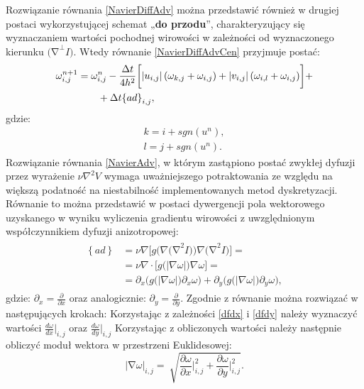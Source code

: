 \documentclass[a4paper,12pt,twoside,openany]{report}
\begin{document}
Rozwiązanie równania \eqref{NavierDiffAdv} można przedstawić również w drugiej postaci wykorzystującej schemat „\textbf{do przodu}”, charakteryzujący się wyznaczaniem wartości pochodnej wirowości w zależności od wyznaczonego kierunku ${\mathrm{(}\mathrm{\nabla }}^{\bot }I)$.  Wtedy równanie \eqref{NavierDiffAdvCen} przyjmuje postać:
\begin{align}
\fontsize{11} \omega
\omega^{n+1}_{i,j} &= {\omega }^n_{i,j} - \frac{\Delta t}{4h^2}\biggl[\left|u_{i,j}\right|
\left({\omega }_{k,j}+{\omega }_{i,j}\right)+
\left|v_{i,j}\right| \left({\omega }_{i,l}+{\omega }_{i,j}\right) \biggr] + \notag\\ 
&\qquad+ \Delta t {\left\{ad\right\}}_{i,j},
\label{NavierDiffAdvFor}
\end{align}
gdzie:
\begin{align}
k = i+sgn\left(u^n\right), \\
l = j+sgn(u^n).
\end{align}
Rozwiązanie równania \eqref{NavierAdv}, w którym zastąpiono postać zwykłej dyfuzji przez wyrażenie $\nu {\nabla }^2V$ wymaga uważniejszego potraktowania ze względu na większą podatność na niestabilność implementowanych metod dyskretyzacji. Równanie to można przedstawić w postaci dywergencji pola wektorowego uzyskanego w wyniku wyliczenia gradientu wirowości z uwzględnionym współczynnikiem dyfuzji anizotropowej:
\begin{align}
\begin{aligned}
\left\{ad\right\} 
&= \nu \nabla\Big[g\Big(\nabla {(\mathrm{\nabla }}^2I)\Big)\nabla {\mathrm{(}\mathrm{\nabla }}^2I)\Big]= \\[1ex]
&= \nu \nabla \cdot \Big[g\big(|\nabla \omega|\big)\nabla \omega \Big]=\\[1ex]
&= \partial _x \Big(g\big(\left|\nabla \omega \right|\big){\partial }_x\omega \Big)+ \partial_y \Big(g\big(\left|\nabla \omega \right|\big){\partial }_y\omega \Big),
\end{aligned}
\label{Anisotropic}
\end{align}
gdzie: ${\partial }_x=\frac{\partial }{\partial x}$ oraz analogicznie: ${\partial }_y=\frac{\partial }{\partial y}$.
Zgodnie z \cite{ebrahimi2012navier} równanie można rozwiązać w następujących krokach:
Korzystając z zależności \eqref{dfdx} i \eqref{dfdy} należy wyznaczyć wartości ${\frac{d\omega }{dx}}\big|_{i,j}$ oraz ${\frac{d\omega }{dy}}\big|_{i,j}$
Korzystając z obliczonych wartości należy następnie obliczyć moduł wektora w przestrzeni Euklidesowej:
\begin{equation}
{\left|\mathrm{\nabla }\omega \right|}_{i,j}=\ \sqrt{\frac{\partial \omega }{\partial x}\bigg|^2_{i,j}+\frac{\partial \omega }{\partial y}\bigg|^2_{i,j}}
\label{magnitudedw}
.
\end{equation}
\end{document}
